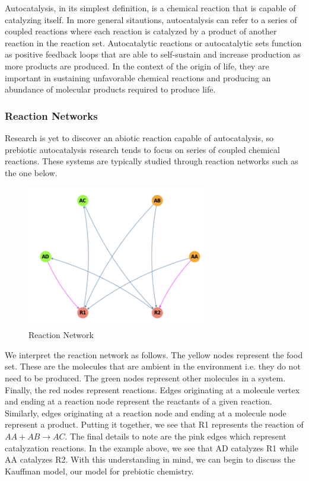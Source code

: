 \documentclass[11pt]{article}
\begin{document}
Autocatalysis, in its simplest definition, is a chemical reaction that is capable of catalyzing itself. 
In more general sitautions, autocatalysis can refer to a series of coupled reactions where each reaction is catalyzed by a product of another reaction in the reaction set. 
Autocatalytic reactions or autocatalytic sets function as positive feedback loops that are able to self-sustain and increase production as more products are produced. 
In the context of the origin of life, they are important in sustaining unfavorable chemical reactions and producing an abundance of molecular products required to produce life.

\subsubsection*{Reaction Networks}

Research is yet to discover an abiotic reaction capable of autocatalysis, so prebiotic autocatalysis research tends to focus on series of coupled chemical reactions. 
These systems are typically studied through reaction networks such as the one below. 

\begin{figure}[H]
    \centering
    \includegraphics[width=8cm]{reaction_network}
    \caption{Reaction Network}
\end{figure}

We interpret the reaction network as follows. The yellow nodes represent the food set. These are the molecules that are ambient in the environment i.e. they do not need to be produced. 
The green nodes represent other molecules in a system. Finally, the red nodes represent reactions. Edges originating at a molecule vertex and ending at a reaction node represent the reactants of a given reaction.
Similarly, edges originating at a reaction node and ending at a molecule node represent a product. 
Putting it together, we see that R1 represents the reaction of $AA + AB \rightarrow AC$. 
The final details to note are the pink edges which represent catalyzation reactions. In the example above, we see that AD catalyzes R1 while AA catalyzes R2.
With this understanding in mind, we can begin to discuss the Kauffman model, our model for prebiotic chemistry. 
\end{document}
